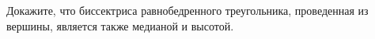 \begin{ex}
	\begin{condition}
		Докажите, что биссектриса равнобедренного треугольника, проведенная из вершины, является также медианой
		и высотой.
	\end{condition}
\end{ex}